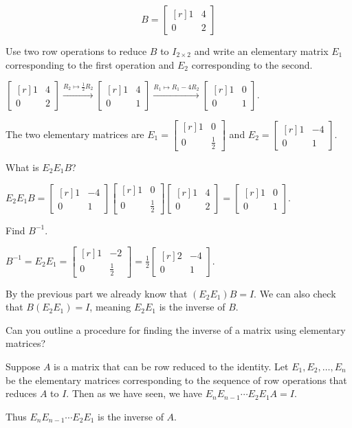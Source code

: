 \documentclass{problemset}
\newcommand{\mat}[1]{\begin{bmatrix*}[r]#1\end{bmatrix*}}
\begin{document}
	\question
	\[
		B=\mat{1 &4\\0 &2}
	\]
	\begin{parts}
		\item Use two row operations to reduce $B$ to $I_{2\times 2}$ and write
			an elementary matrix $E_1$ corresponding to the first operation and
			$E_2$ corresponding to the second.
			\begin{solution}
				$\mat{1&4\\0&2}\xrightarrow{R_2\mapsto \frac{1}{2}R_2}\mat{1&4\\0&1}
				\xrightarrow{R_1\mapsto R_1-4R_2}\mat{1&0\\0&1}$.

				The two elementary matrices are $E_1=\mat{1&0\\0&\frac{1}{2}}$
				and $E_2=\mat{1&-4\\0&1}$.
			\end{solution}
		\item What is $E_2E_1B$?
			\begin{solution}
				$E_2E_1B=\mat{1&-4\\0&1}\mat{1&0\\0&\frac{1}{2}}\mat{1 &4\\0 &2}=\mat{1&0\\0&1}$.
			\end{solution}
		\item Find $B^{-1}$.
			\begin{solution}
				$B^{-1}=E_2E_1=\mat{1&-2\\0&\frac{1}{2}}=\frac{1}{2}\mat{2&-4\\0&1}$.

				By the previous part we already know that $(E_2E_1)B=I$. We can also
				check that $B(E_2E_1)=I$, meaning $E_2E_1$ is the inverse of $B$.
			\end{solution}
		\item Can you outline a procedure for finding the inverse of a matrix
		using elementary matrices?
			\begin{solution}
				Suppose $A$ is a matrix that can be row reduced to the identity.
				Let $E_1, E_2, \dots, E_n$ be the elementary matrices corresponding
				to the sequence of row operations that reduces $A$ to $I$. Then
				as we have seen, we have $E_n E_{n-1} \cdots E_2 E_1 A = I$. 

				Thus $E_n E_{n-1} \cdots E_2 E_1$ is the inverse of $A$. 
			\end{solution}
	\end{parts}
\end{document}

